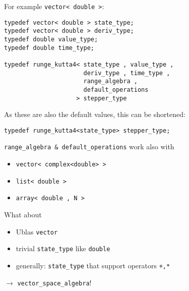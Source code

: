 \begin{frame}[fragile]


For example \lstinline+vector< double >+:
\begin{lstlisting}
typedef vector< double > state_type;
typedef vector< double > deriv_type;
typedef double value_type;
typedef double time_type;

typedef runge_kutta4< state_type , value_type , 
                      deriv_type , time_type , 
                      range_algebra , 
                      default_operations 
                    > stepper_type
\end{lstlisting}

\vspace{1em}
As these are also the default values, this can be shortened:
\begin{lstlisting}
typedef runge_kutta4<state_type> stepper_type; 
\end{lstlisting}

\end{frame}


\begin{frame}[fragile]
 \lstinline+range_algebra & default_operations+ work also with

\begin{itemize}
 \item \lstinline+vector< complex<double> >+
 \item \lstinline+list< double >+
 \item \lstinline+array< double , N >+
\end{itemize}

\pause
What about
\begin{itemize}
 \item Ublas \lstinline+vector+
 \item trivial \lstinline+state_type+ like \lstinline+double+
 \item generally: \lstinline+state_type+ that support operators \lstinline!+,*!
\end{itemize}

\vspace{1em}
\centerline{$\longrightarrow$ \lstinline+vector_space_algebra+!}

\end{frame}


